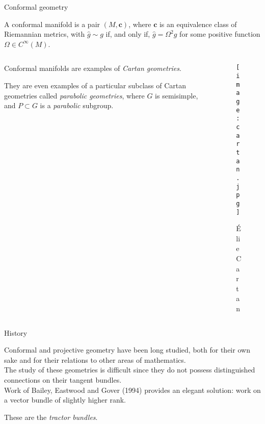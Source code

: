 \documentclass{beamer}
\renewcommand{\hat}{\widehat}
\begin{document}
\begin{frame}{Conformal geometry}

  \begin{definition}
    A conformal manifold is a pair \( (M, \bm{c}) \), where \( \bm{c} \) is an equivalence class of Riemannian metrics, with \( \hat{g} \sim g \) if, and only if, \( \hat{g} = \Omega^2 g \) for some positive function \( \Omega \in C^\infty (M) \).
  \end{definition}

  \begin{columns}
    \begin{column}{0.6\textwidth}
      \pause
      Conformal manifolds are examples of \emph{Cartan geometries}.
      \vspace{1em}

      \pause
      They are even examples of 
      a particular subclass of Cartan geometries called \emph{parabolic geometries}, where \( G \) is semisimple, and \( P \subset G \) is a \emph{parabolic} subgroup.
    \end{column}
      \begin{column}{0.4\textwidth}
        \hspace{1.5em}
        \begin{figure}
          \texttt{[image: cartan.jpg]}
          \caption*{\'{E}lie Cartan}
        \end{figure}
      \end{column}
  \end{columns}

\end{frame}

\begin{frame}{History}

Conformal and projective geometry have been long studied, both for their own sake and for their relations to other areas of mathematics.
\vspace{1em}\\
\pause
The study of these geometries is difficult since they do not possess distinguished connections on their tangent bundles.
\vspace{1em}\\
\pause
Work of Bailey, Eastwood and Gover (1994) provides an elegant solution: work on a vector bundle of slightly higher rank. 

These are the \emph{tractor bundles}.

\end{frame}
\end{document}
